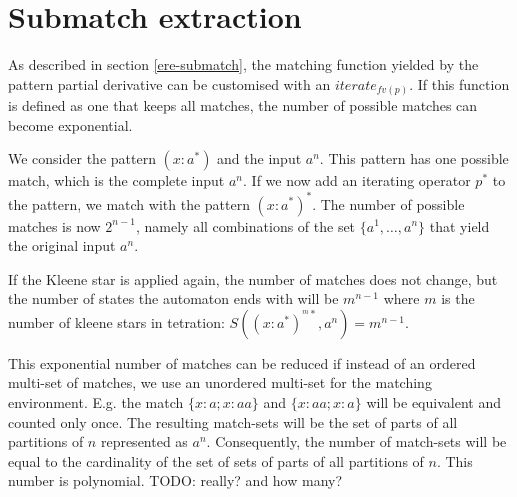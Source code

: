 \section{Submatch extraction}
\label{submatch}

As described in section \ref{ere-submatch}, the matching function yielded by
the pattern partial derivative can be customised with an $iterate_{fv(p)}$. If
this function is defined as one that keeps all matches, the number of possible
matches can become exponential.

We consider the pattern $(x:a^*)$ and the input $a^n$. This pattern has one
possible match, which is the complete input $a^n$. If we now add an iterating
operator $p^*$ to the pattern, we match with the pattern $(x:a^*)^*$. The
number of possible matches is now $2^{n-1}$, namely all combinations of the
set $\{ a^1, \dots, a^n \}$ that yield the original input $a^n$.

If the Kleene star is applied again, the number of matches does not change,
but the number of states the automaton ends with will be $m^{n-1}$ where $m$
is the number of kleene stars in tetration: $S((x:a^*)^{^m*}, a^n) = m^{n-1}$.

This exponential number of matches can be reduced if instead of an ordered
multi-set of matches, we use an unordered multi-set for the matching
environment. E.g. the match $\{ x:a; x:aa \}$ and $\{ x:aa; x:a \}$ will be
equivalent and counted only once. The resulting match-sets will be the set of
parts of all partitions of $n$ represented as $a^n$. Consequently, the number
of match-sets will be equal to the cardinality of the set of sets of parts of
all partitions of $n$. This number is polynomial. TODO: really? and how many?



